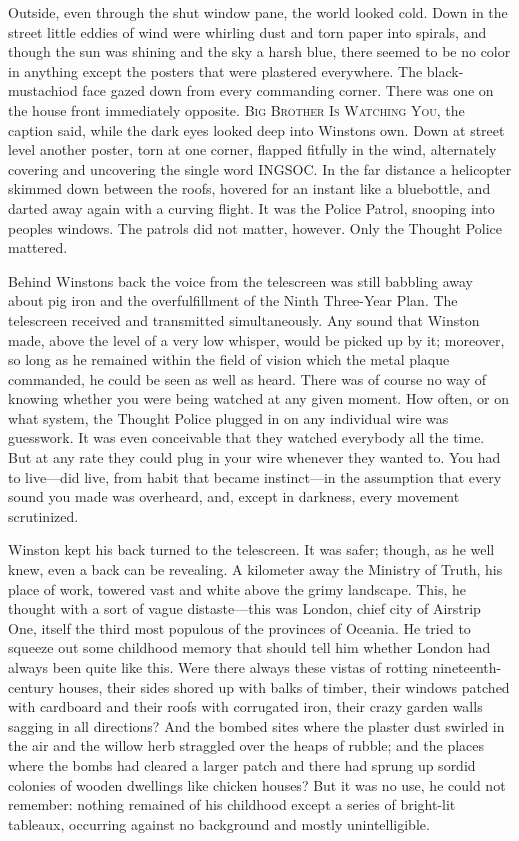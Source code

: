 Outside, even through the shut window pane, the world looked cold. Down
in the street little eddies of wind were whirling dust and torn paper
into spirals, and though the sun was shining and the sky a harsh blue,
there seemed to be no color in anything except the posters that were
plastered everywhere. The black-mustachio\textquotesingle d face gazed
down from every commanding corner. There was one on the house front
immediately opposite. \textsc{Big Brother Is Watching You}, the caption said,
while the dark eyes looked deep into Winston\textquotesingle s own. Down
at street level another poster, torn at one corner, flapped fitfully in
the wind, alternately covering and uncovering the single word INGSOC. In
the far distance a helicopter skimmed down between the roofs, hovered
for an instant like a bluebottle, and darted away again with a curving
flight. It was the Police Patrol, snooping into people\textquotesingle s
windows. The patrols did not matter, however. Only the Thought Police
mattered.

Behind Winston\textquotesingle s back the voice from the telescreen was
still babbling away about pig iron and the overfulfillment of the Ninth
Three-Year Plan. The telescreen received and transmitted simultaneously.
Any sound that Winston made, above the level of a very low whisper,
would be picked up by it; moreover, so long as he remained within the
field of vision which the metal plaque commanded, he could be seen as
well as heard. There was of course no way of knowing whether you were
being watched at any given moment. How often, or on what system, the
Thought Police plugged in on any individual wire was guesswork. It was
even conceivable that they watched everybody all the time. But at any
rate they could plug in your wire whenever they wanted to. You had to
live---did live, from habit that became instinct---in the assumption
that every sound you made was overheard, and, except in darkness, every
movement scrutinized.

Winston kept his back turned to the telescreen. It was safer; though, as
he well knew, even a back can be revealing. A kilometer away the
Ministry of Truth, his place of work, towered vast and white above the
grimy landscape. This, he thought with a sort of vague distaste---this
was London, chief city of Airstrip One, itself the third most populous
of the provinces of Oceania. He tried to squeeze out some childhood
memory that should tell him whether London had always been quite like
this. Were there always these vistas of rotting nineteenth-century
houses, their sides shored up with balks of timber, their windows
patched with cardboard and their roofs with corrugated iron, their crazy
garden walls sagging in all directions? And the bombed sites where the
plaster dust swirled in the air and the willow herb straggled over the
heaps of rubble; and the places where the bombs had cleared a larger
patch and there had sprung up sordid colonies of wooden dwellings like
chicken houses? But it was no use, he could not remember: nothing
remained of his childhood except a series of bright-lit tableaux,
occurring against no background and mostly unintelligible.

